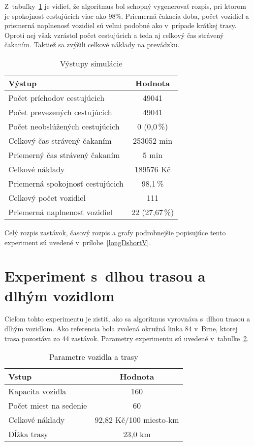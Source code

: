 Z~tabuľky~\ref{tab:longDshortVout} je vidieť, že algoritmus bol schopný vygenerovať rozpis, pri ktorom je spokojnosť cestujúcich viac ako 98\%.
Priemerná čakacia doba, počet vozidiel a priemerná naplnenosť vozidiel sú veľmi podobné ako v~prípade krátkej trasy.
Oproti nej však vzrástol počet cestujúcich a teda aj celkový čas strávený čakaním.
Taktiež sa zvýšili celkové náklady na prevádzku.

\begin{table}[h]
  \centering
  \begin{tabular}{|l|c|}
    \hline
      \textbf{Výstup} & \textbf{Hodnota} \\ \hline
        Počet príchodov cestujúcich & 49041 \\ \hline
        Počet prevezených cestujúcich & 49041 \\ \hline
        Počet neobslúžených cestujúcich & 0 (0,0\,\%) \\ \hline
        Celkový čas strávený čakaním & 253052 min \\ \hline
        Priemerný čas strávený čakaním & 5 min \\ \hline
        Celkové náklady & 189576 Kč \\ \hline
        Priemerná spokojnosť cestujúcich & 98,1\,\% \\ \hline
        Celkový počet vozidiel & 111 \\ \hline
        Priemerná naplnenosť vozidiel & 22 (27,67\,\%) \\ \hline
  \end{tabular}
  \caption{Výstupy simulácie}
  \label{tab:longDshortVout}
\end{table}

Celý rozpis zastávok, časový rozpis a grafy podrobnejšie popisujúce tento experiment sú uvedené v~prílohe~\ref{longDshortV}.

\newpage
\section{Experiment s~dlhou trasou a dlhým vozidlom}
Cieľom tohto experimentu je zistiť, ako sa algoritmus vyrovnáva s~dlhou trasou a dlhým vozidlom.
Ako referencia bola zvolená okružná linka 84 v~Brne, ktorej trasa pozostáva zo 44 zastávok.
Parametry experimentu sú uvedené v~tabuľke~\ref{tab:longDlongVin}.

\begin{table}[h]
  \centering
  \begin{tabular}{|l|c|}
    \hline
    \textbf{Vstup} & \textbf{Hodnota} \\ \hline
    Kapacita vozidla & 160 \\ \hline
    Počet miest na sedenie & 60 \\ \hline
    Celkové náklady & 92,82 Kč/100 miesto-km \\ \hline
    Dĺžka trasy & 23,0 km \\ \hline
  \end{tabular}
  \caption{Parametre vozidla a trasy}
  \label{tab:longDlongVin}
\end{table}

